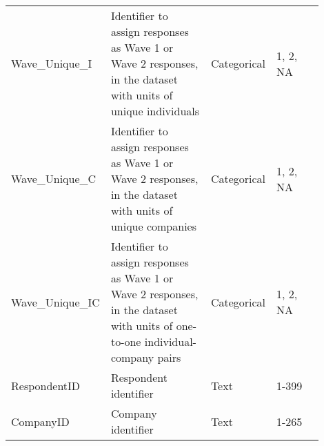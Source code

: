 \documentclass[12pt, letterpaper]{article}
\begin{document}
{\begin{longtable}{|p{0.2\linewidth}|p{0.4\linewidth}|p{0.1\linewidth}|p{0.2\linewidth}|}
Wave\_Unique\_I              & Identifier to assign responses as Wave 1 or Wave 2 responses, in the dataset with units of unique individuals                                                                                                                                                                       & Categorical & 1, 2, NA                                                                                                                                                                                                                                        \\
Wave\_Unique\_C              & Identifier to assign responses as Wave 1 or Wave 2 responses, in the dataset with units of unique companies                                                                                                                                                                         & Categorical & 1, 2, NA                                                                                                                                                                                                                                        \\
Wave\_Unique\_IC             & Identifier to assign responses as Wave 1 or Wave 2 responses, in the dataset with units of one-to-one individual-company pairs                                                                                                                                                       & Categorical & 1, 2, NA                                                                                                                                                                                                                                        \\
RespondentID                 & Respondent identifier                                                                                                                                                                                                                                                               & Text        & 1-399
\\
CompanyID                    & Company identifier                                                                                                                                                                                                                                                                  & Text        &                                                                                                                                                                                                                                        1-265 \\

\end{longtable}}
\end{document}
